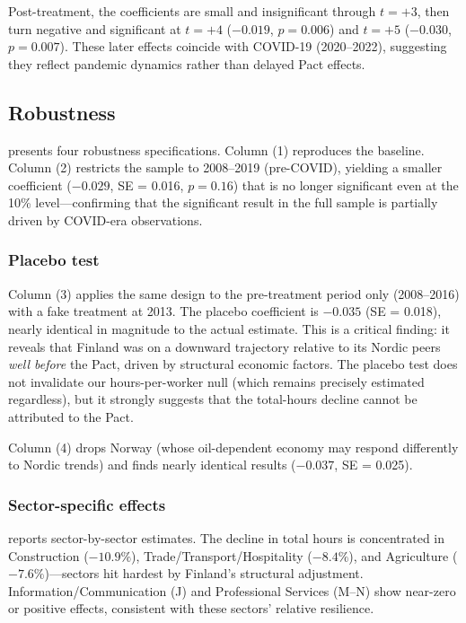 \documentclass[12pt]{article}
\begin{document}
Post-treatment, the coefficients are small and insignificant through $t = +3$, then turn negative and significant at $t = +4$ ($-0.019$, $p = 0.006$) and $t = +5$ ($-0.030$, $p = 0.007$). These later effects coincide with COVID-19 (2020--2022), suggesting they reflect pandemic dynamics rather than delayed Pact effects.


\subsection{Robustness}



 presents four robustness specifications. Column (1) reproduces the baseline. Column (2) restricts the sample to 2008--2019 (pre-COVID), yielding a smaller coefficient ($-0.029$, SE = 0.016, $p = 0.16$) that is no longer significant even at the 10\% level---confirming that the significant result in the full sample is partially driven by COVID-era observations.

\subsubsection*{Placebo test} Column (3) applies the same design to the pre-treatment period only (2008--2016) with a fake treatment at 2013. The placebo coefficient is $-0.035$ (SE = 0.018), nearly identical in magnitude to the actual estimate. This is a critical finding: it reveals that Finland was on a downward trajectory relative to its Nordic peers \textit{well before} the Pact, driven by structural economic factors. The placebo test does not invalidate our hours-per-worker null (which remains precisely estimated regardless), but it strongly suggests that the total-hours decline cannot be attributed to the Pact.

Column (4) drops Norway (whose oil-dependent economy may respond differently to Nordic trends) and finds nearly identical results ($-0.037$, SE = 0.025).

\subsubsection*{Sector-specific effects}  reports sector-by-sector estimates. The decline in total hours is concentrated in Construction ($-10.9\%$), Trade/Transport/Hospitality ($-8.4\%$), and Agriculture ($-7.6\%$)---sectors hit hardest by Finland's structural adjustment. Information/Communication (J) and Professional Services (M--N) show near-zero or positive effects, consistent with these sectors' relative resilience.
\end{document}
